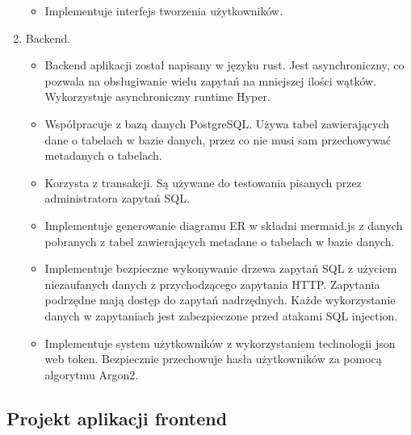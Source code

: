 \begin{enumerate}
\begin{itemize}
        \item Implementuje interfejs tworzenia użytkowników.

    \end{itemize}

    \item Backend.

    \begin{itemize}

        \item Backend aplikacji został napisany w języku rust. Jest
        asynchroniczny, co pozwala na obsługiwanie wielu zapytań na mniejszej
        ilości wątków. Wykorzystuje asynchroniczny runtime Hyper.

        \item Współpracuje z bazą danych PostgreSQL. Używa tabel
        zawierających dane o tabelach w bazie danych, przez co nie musi sam
        przechowywać metadanych o tabelach.

        \item Korzysta z transakcji. Są używane do testowania pisanych
        przez administratora zapytań SQL.

        \item Implementuje generowanie diagramu ER w składni mermaid.js z danych
        pobranych z tabel zawierających metadane o tabelach w bazie danych.

        \item Implementuje bezpieczne wykonywanie drzewa zapytań SQL z użyciem
        niezaufanych danych z przychodzącego zapytania HTTP. Zapytania podrzędne
        mają dostęp do zapytań nadrzędnych. Każde wykorzystanie danych w
        zapytaniach jest zabezpieczone przed atakami SQL injection.

        \item Implementuje system użytkowników z wykorzystaniem technologii json
        web token. Bezpiecznie przechowuje hasła użytkowników za pomocą
        algorytmu Argon2.

    \end{itemize}

\end{enumerate}

\subsection{Projekt aplikacji frontend}


